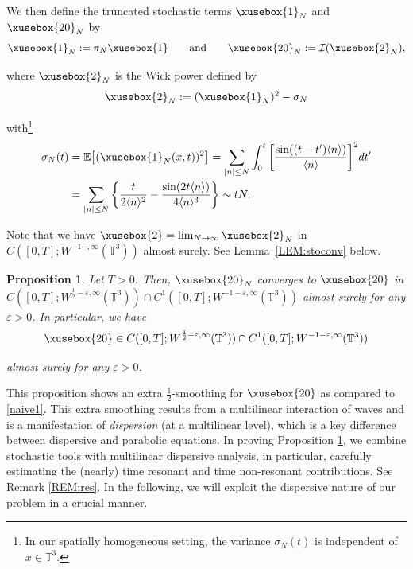 \documentclass[%
11pt,  reqno]{amsart}
\def\<#1>{\xusebox{#1}}
\newtheorem{proposition}[theorem]{Proposition}
\newcommand{\1}{\hspace{0.2mm}\text{I}\hspace{0.2mm}}
\newcommand{\noi}{\noindent}
\newcommand{\T}{\mathbb{T}}
\newcommand{\E}{\mathbb{E}}
\newcommand{\eps}{\varepsilon}
\newcommand{\s}{\sigma}
\newcommand{\jb}[1]
{\langle #1 \rangle}
\newcommand{\I}{\mathcal{I}}
\numberwithin{equation}{section}
\numberwithin{theorem}{section}
\begin{document}
\noi
We then define the truncated stochastic terms  $\<1>_N$ 
and   $\<20>_N$ by 
\begin{align}
\<1>_N := \pi_N \<1>
\qquad \text{and}
\qquad 
  \<20>_N := \I (\<2>_N), 
\label{so4a}
\end{align}

\noi
where $\<2>_N$ is the Wick power
defined by 
\begin{align}
\<2>_N   := (\<1>_N)^2 - \s_N
\label{so4b}
\end{align}

\noi
 with\footnote{In our spatially homogeneous setting,
the variance $\s_N(t)$ is independent of $x \in \T^3$.} 
\begin{align}
\begin{split}
\s_N(t) & = \E\big[ (\<1>_N(x, t))^2\big]
=  \sum_{|n|\leq N}
\int_0^t \bigg[\frac{\sin((t - t')\jb{n})}{\jb{n}} \bigg]^2 dt'\\
& = \sum_{|n|\leq N} \bigg\{\frac{t}{2\jb{n}^2} - \frac{\sin(2t \jb{n})}{4\jb{n}^3}\bigg\}
\sim t N.
\end{split}
\label{sigma1}
\end{align}


\noi
Note that we have 
$\<2> = \lim_{N \to \infty} \<2>_N$ in $C([0,T];W^{-1 - ,\infty}(\T^3))$ almost surely.
See Lemma~\ref{LEM:stoconv} below.

\begin{proposition}\label{PROP:sto1}
Let   $T >0$.
Then, 
$ \<20>_N $ converges to 
$\<20>$
in 
$C([0,T];W^{\frac 12 -\eps,\infty}(\T^3)) \cap C^1([0,T];W^{-1 -\eps,\infty}(\T^3))$
almost surely
for any  $\eps > 0$.
 In particular, we have
  \[\<20> \in C([0,T];W^{\frac 12 -\eps,\infty}(\T^3))
  \cap C^1([0,T];W^{-1 -\eps,\infty}(\T^3))\]
  
  \noi
  almost surely for any  $\eps > 0$.
\end{proposition}


This proposition shows an extra $\frac 12$-smoothing
for $\<20>$ as compared to \eqref{naive1}.
This extra smoothing results from a multilinear interaction of waves
and is a manifestation of {\it dispersion} (at a multilinear level), 
which is  a key difference between  dispersive and parabolic equations.
In proving Proposition \ref{PROP:sto1}, 
we combine stochastic tools with multilinear dispersive analysis, 
in particular, carefully estimating
the  (nearly) time resonant and time non-resonant contributions.
See Remark \ref{REM:res}.
In the following, we will exploit
the dispersive nature of our problem in a crucial manner. 
\end{document}
